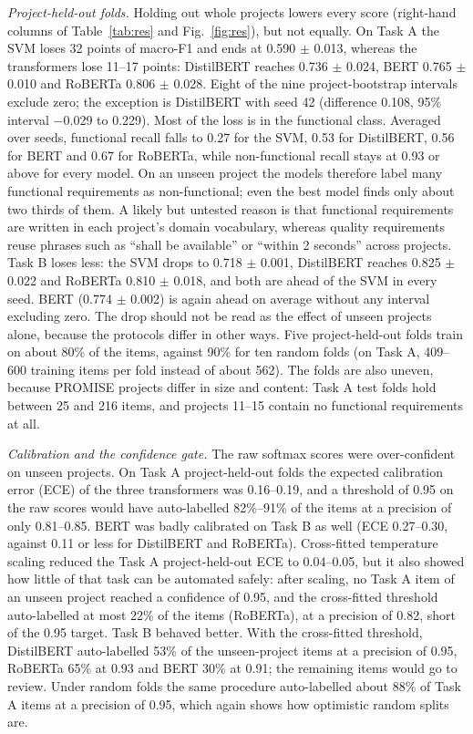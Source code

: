 \documentclass[conference,10pt,letterpaper]{IEEEtran}
\begin{document}
\emph{Project-held-out folds.} Holding out whole projects lowers every score (right-hand columns of Table~\ref{tab:res} and Fig.~\ref{fig:res}), but not equally. On Task A the SVM loses 32 points of macro-F1 and ends at 0.590 $\pm$ 0.013, whereas the transformers lose 11–17 points: DistilBERT reaches 0.736 $\pm$ 0.024, BERT 0.765 $\pm$ 0.010 and RoBERTa 0.806 $\pm$ 0.028. Eight of the nine project-bootstrap intervals exclude zero; the exception is DistilBERT with seed 42 (difference 0.108, 95\% interval $-$0.029 to 0.229). Most of the loss is in the functional class. Averaged over seeds, functional recall falls to 0.27 for the SVM, 0.53 for DistilBERT, 0.56 for BERT and 0.67 for RoBERTa, while non-functional recall stays at 0.93 or above for every model. On an unseen project the models therefore label many functional requirements as non-functional; even the best model finds only about two thirds of them. A likely but untested reason is that functional requirements are written in each project's domain vocabulary, whereas quality requirements reuse phrases such as “shall be available” or “within 2 seconds” across projects. Task B loses less: the SVM drops to 0.718 $\pm$ 0.001, DistilBERT reaches 0.825 $\pm$ 0.022 and RoBERTa 0.810 $\pm$ 0.018, and both are ahead of the SVM in every seed. BERT (0.774 $\pm$ 0.002) is again ahead on average without any interval excluding zero. The drop should not be read as the effect of unseen projects alone, because the protocols differ in other ways. Five project-held-out folds train on about 80\% of the items, against 90\% for ten random folds (on Task A, 409–600 training items per fold instead of about 562). The folds are also uneven, because PROMISE projects differ in size and content: Task A test folds hold between 25 and 216 items, and projects 11–15 contain no functional requirements at all.

\emph{Calibration and the confidence gate.} The raw softmax scores were over-confident on unseen projects. On Task A project-held-out folds the expected calibration error (ECE) of the three transformers was 0.16–0.19, and a threshold of 0.95 on the raw scores would have auto-labelled 82\%–91\% of the items at a precision of only 0.81–0.85. BERT was badly calibrated on Task B as well (ECE 0.27–0.30, against 0.11 or less for DistilBERT and RoBERTa). Cross-fitted temperature scaling reduced the Task A project-held-out ECE to 0.04–0.05, but it also showed how little of that task can be automated safely: after scaling, no Task A item of an unseen project reached a confidence of 0.95, and the cross-fitted threshold auto-labelled at most 22\% of the items (RoBERTa), at a precision of 0.82, short of the 0.95 target. Task B behaved better. With the cross-fitted threshold, DistilBERT auto-labelled 53\% of the unseen-project items at a precision of 0.95, RoBERTa 65\% at 0.93 and BERT 30\% at 0.91; the remaining items would go to review. Under random folds the same procedure auto-labelled about 88\% of Task A items at a precision of 0.95, which again shows how optimistic random splits are.
\end{document}
